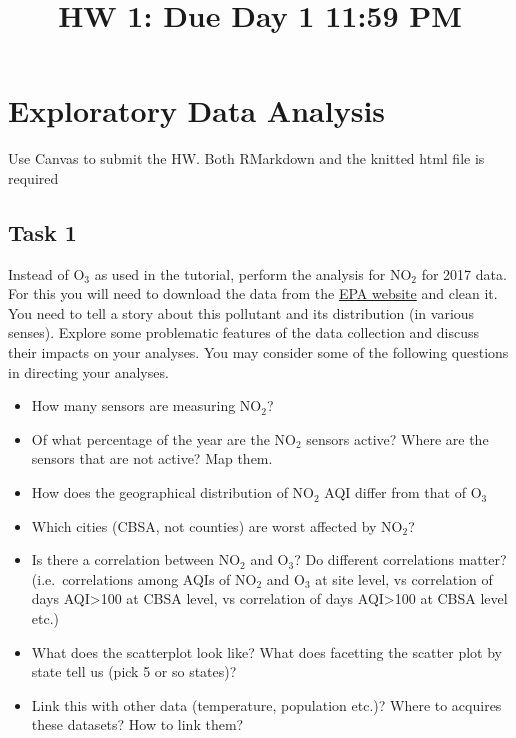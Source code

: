 \documentclass[]{article}
\title{HW 1: Due Day 1 11:59 PM}
\author{}
\date{}
\providecommand{\tightlist}{%
  \setlength{\itemsep}{0pt}\setlength{\parskip}{0pt}}
\begin{document}
\maketitle

\section{Exploratory Data Analysis}\label{exploratory-data-analysis}

Use Canvas to submit the HW. Both RMarkdown and the knitted html file is
required

\subsection{Task 1}\label{task-1}

Instead of O\(_3\) as used in the tutorial, perform the analysis for
NO\(_2\) for 2017 data. For this you will need to download the data from
the \href{https://aqs.epa.gov/aqsweb/airdata/download_files.html}{EPA
website} and clean it. You need to tell a story about this pollutant and
its distribution (in various senses). Explore some problematic features
of the data collection and discuss their impacts on your analyses. You
may consider some of the following questions in directing your analyses.

\begin{itemize}
\tightlist
\item
  How many sensors are measuring NO\(_2\)?
\item
  Of what percentage of the year are the NO\(_2\) sensors active? Where
  are the sensors that are not active? Map them.
\item
  How does the geographical distribution of NO\(_2\) AQI differ from
  that of O\(_3\)
\item
  Which cities (CBSA, not counties) are worst affected by NO\(_2\)?
\item
  Is there a correlation between NO\(_2\) and O\(_3\)? Do different
  correlations matter? (i.e.~correlations among AQIs of NO\(_2\) and
  O\(_3\) at site level, vs correlation of days AQI\textgreater{}100 at
  CBSA level, vs correlation of days AQI\textgreater{}100 at CBSA level
  etc.)
\item
  What does the scatterplot look like? What does facetting the scatter
  plot by state tell us (pick 5 or so states)?
\item
  Link this with other data (temperature, population etc.)? Where to
  acquires these datasets? How to link them?
\end{itemize}
\end{document}
